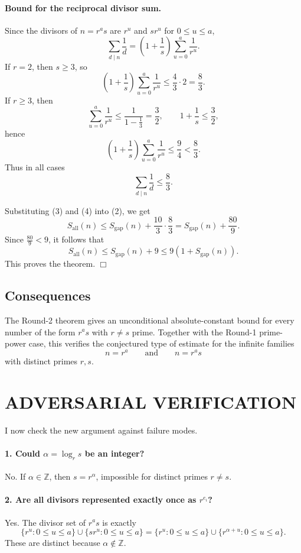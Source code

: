 \paragraph{Bound for the reciprocal divisor sum.}
Since the divisors of \(n=r^a s\) are \(r^u\) and \(sr^u\) for \(0\leq u\leq a\),
\[
\sum_{d\mid n}\frac{1}{d}
=
\left(1+\frac{1}{s}\right)\sum_{u=0}^{a}\frac{1}{r^u}.
\]
If \(r=2\), then \(s\geq 3\), so
\[
\left(1+\frac{1}{s}\right)\sum_{u=0}^{a}\frac{1}{r^u}
\leq
\frac{4}{3}\cdot 2
=
\frac{8}{3}.
\]
If \(r\geq 3\), then
\[
\sum_{u=0}^{a}\frac{1}{r^u}\leq \frac{1}{1-\frac{1}{3}}=\frac{3}{2},
\qquad
1+\frac{1}{s}\leq \frac{3}{2},
\]
hence
\[
\left(1+\frac{1}{s}\right)\sum_{u=0}^{a}\frac{1}{r^u}
\leq
\frac{9}{4}
<
\frac{8}{3}.
\]
Thus in all cases
\[
\sum_{d\mid n}\frac{1}{d}\leq \frac{8}{3}.
\tag{4}
\]

Substituting (3) and (4) into (2), we get
\[
S_{\mathrm{all}}(n)
\leq
S_{\mathrm{gap}}(n)
+
\frac{10}{3}\cdot \frac{8}{3}
=
S_{\mathrm{gap}}(n)+\frac{80}{9}.
\]
Since \(\frac{80}{9}<9\), it follows that
\[
S_{\mathrm{all}}(n)\leq S_{\mathrm{gap}}(n)+9 \leq 9(1+S_{\mathrm{gap}}(n)).
\]
This proves the theorem.
\qquad \(\Box\)

\subsection*{Consequences}

The Round-2 theorem gives an unconditional absolute-constant bound for every number of the form \(r^a s\) with \(r\neq s\) prime. Together with the Round-1 prime-power case, this verifies the conjectured type of estimate for the infinite families
\[
n=r^a
\qquad\text{and}\qquad
n=r^a s
\]
with distinct primes \(r,s\).

\section{ADVERSARIAL VERIFICATION}

I now check the new argument against failure modes.

\paragraph{1. Could \(\alpha=\log_r s\) be an integer?}
No. If \(\alpha\in\mathbb Z\), then \(s=r^\alpha\), impossible for distinct primes \(r\neq s\).

\paragraph{2. Are all divisors represented exactly once as \(r^{e_i}\)?}
Yes. The divisor set of \(r^a s\) is exactly
\[
\{r^u:0\leq u\leq a\}\cup \{sr^u:0\leq u\leq a\}
=
\{r^u:0\leq u\leq a\}\cup \{r^{\alpha+u}:0\leq u\leq a\}.
\]
These are distinct because \(\alpha\notin\mathbb Z\).

